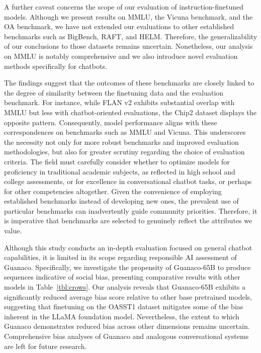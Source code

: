A further caveat concerns the scope of our evaluation of instruction-finetuned models. Although we present results on MMLU, the Vicuna benchmark, and the OA benchmark, we have not extended our evaluations to other established benchmarks such as BigBench, RAFT, and HELM. Therefore, the generalizability of our conclusions to those datasets remains uncertain. Nonetheless, our analysis on MMLU is notably comprehensive and we also introduce novel evaluation methods specifically for chatbots.

The findings suggest that the outcomes of these benchmarks are closely linked to the degree of similarity between the finetuning data and the evaluation benchmark. For instance, while FLAN v2 exhibits substantial overlap with MMLU but less with chatbot-oriented evaluations, the Chip2 dataset displays the opposite pattern. Consequently, model performance aligns with these correspondences on benchmarks such as MMLU and Vicuna. This underscores the necessity not only for more robust benchmarks and improved evaluation methodologies, but also for greater scrutiny regarding the choice of evaluation criteria. The field must carefully consider whether to optimize models for proficiency in traditional academic subjects, as reflected in high school and college assessments, or for excellence in conversational chatbot tasks, or perhaps for other competencies altogether. Given the convenience of employing established benchmarks instead of developing new ones, the prevalent use of particular benchmarks can inadvertently guide community priorities. Therefore, it is imperative that benchmarks are selected to genuinely reflect the attributes we value.

Although this study conducts an in-depth evaluation focused on general chatbot capabilities, it is limited in its scope regarding responsible AI assessment of {Guanaco}. Specifically, we investigate the propensity of {Guanaco}-65B to produce sequences indicative of social bias, presenting comparative results with other models in Table~\ref{tbl:crows}. Our analysis reveals that {Guanaco}-65B exhibits a significantly reduced average bias score relative to other base pretrained models, suggesting that finetuning on the OASST1 dataset mitigates some of the bias inherent in the LLaMA foundation model. Nevertheless, the extent to which {Guanaco} demonstrates reduced bias across other dimensions remains uncertain. Comprehensive bias analyses of {Guanaco} and analogous conversational systems are left for future research.

